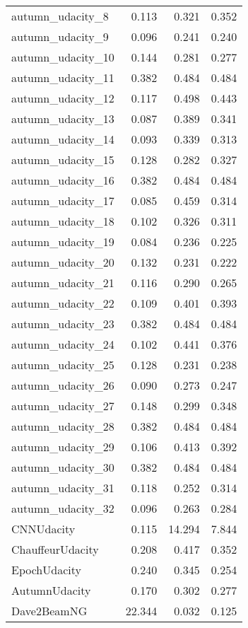 \begin{tabular}{lrrr}
autumn\_udacity\_8  &          0.113 &   0.321 &   0.352 \\
autumn\_udacity\_9  &          0.096 &   0.241 &   0.240 \\
autumn\_udacity\_10 &          0.144 &   0.281 &   0.277 \\
autumn\_udacity\_11 &          0.382 &   0.484 &   0.484 \\
autumn\_udacity\_12 &          0.117 &   0.498 &   0.443 \\
autumn\_udacity\_13 &          0.087 &   0.389 &   0.341 \\
autumn\_udacity\_14 &          0.093 &   0.339 &   0.313 \\
autumn\_udacity\_15 &          0.128 &   0.282 &   0.327 \\
autumn\_udacity\_16 &          0.382 &   0.484 &   0.484 \\
autumn\_udacity\_17 &          0.085 &   0.459 &   0.314 \\
autumn\_udacity\_18 &          0.102 &   0.326 &   0.311 \\
autumn\_udacity\_19 &          0.084 &   0.236 &   0.225 \\
autumn\_udacity\_20 &          0.132 &   0.231 &   0.222 \\
autumn\_udacity\_21 &          0.116 &   0.290 &   0.265 \\
autumn\_udacity\_22 &          0.109 &   0.401 &   0.393 \\
autumn\_udacity\_23 &          0.382 &   0.484 &   0.484 \\
autumn\_udacity\_24 &          0.102 &   0.441 &   0.376 \\
autumn\_udacity\_25 &          0.128 &   0.231 &   0.238 \\
autumn\_udacity\_26 &          0.090 &   0.273 &   0.247 \\
autumn\_udacity\_27 &          0.148 &   0.299 &   0.348 \\
autumn\_udacity\_28 &          0.382 &   0.484 &   0.484 \\
autumn\_udacity\_29 &          0.106 &   0.413 &   0.392 \\
autumn\_udacity\_30 &          0.382 &   0.484 &   0.484 \\
autumn\_udacity\_31 &          0.118 &   0.252 &   0.314 \\
autumn\_udacity\_32 &          0.096 &   0.263 &   0.284 \\
CNNUdacity        &          0.115 &  14.294 &   7.844 \\
ChauffeurUdacity  &          0.208 &   0.417 &   0.352 \\
EpochUdacity      &          0.240 &   0.345 &   0.254 \\
AutumnUdacity     &          0.170 &   0.302 &   0.277 \\
Dave2BeamNG       &         22.344 &   0.032 &   0.125 \\
\bottomrule
\end{tabular}
